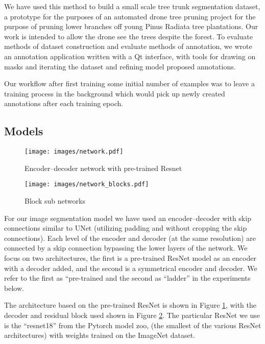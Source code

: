 \documentclass{IEEEtran}
\begin{document}
We have used this method to build a small scale tree trunk segmentation dataset, a prototype for the purposes of an automated drone tree pruning project for the purpose of pruning lower branches off young Pinus Radiata tree plantations. Our work is intended to allow the drone see the trees despite the forest. To evaluate methods of dataset construction and evaluate methods of annotation, we wrote an annotation application written with a Qt interface, with tools for drawing on masks and iterating the dataset and refining model proposed annotations.

Our workflow after first training some initial number of examples was to leave a training process in the background which would pick up newly created annotations after each training epoch. 


\subsection {Models}

\begin{figure}[h]
  \centering
  \texttt{[image: images/network.pdf]}
  \caption{Encoder--decoder network with pre-trained Resnet}  
  \label{fig:network}
\end{figure}
\begin{figure}
  \centering
  \texttt{[image: images/network\_blocks.pdf]}
  \caption{Block sub networks}  
  \label{fig:decode_block}
\end{figure}

For our image segmentation model we have used an encoder--decoder with skip connections similar to UNet \cite{Ronneberger2015} (utilizing padding and without cropping the skip connections). Each level of the encoder and decoder (at the same resolution) are connected by a skip connection bypassing the lower layers of the network. We focus on two architectures, the first is a pre-trained ResNet model as an encoder with a decoder added, and the second is a symmetrical encoder and decoder. We refer to the first as ``pre-trained and the second as ``ladder'' in the experiments below.

The architecture based on the pre-trained ResNet is shown in Figure \ref{fig:network}, with the decoder and residual block used shown in Figure \ref{fig:decode_block}. The particular ResNet we use is the ``resnet18'' from the Pytorch model zoo, (the smallest of the various ResNet architectures) with weights trained on the ImageNet dataset. 
\end{document}

